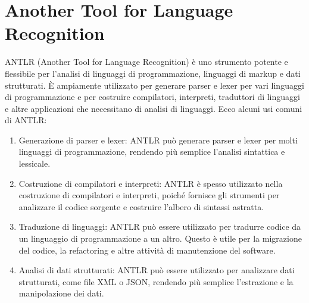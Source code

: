 \documentclass[../../main.tex]{subfiles}
\begin{document}
\section{Another Tool for Language Recognition}
ANTLR (Another Tool for Language Recognition) è uno strumento potente e flessibile per l'analisi di linguaggi di programmazione, linguaggi di markup e dati strutturati. È ampiamente utilizzato per generare parser e lexer per vari linguaggi di programmazione e per costruire compilatori, interpreti, traduttori di linguaggi e altre applicazioni che necessitano di analisi di linguaggi.
Ecco alcuni usi comuni di ANTLR:
\begin{enumerate}
    \item Generazione di parser e lexer: ANTLR può generare parser e lexer per molti linguaggi di programmazione, rendendo più semplice l'analisi sintattica e lessicale.
    \item Costruzione di compilatori e interpreti: ANTLR è spesso utilizzato nella costruzione di compilatori e interpreti, poiché fornisce gli strumenti per analizzare il codice sorgente e costruire l'albero di sintassi astratta.
    \item Traduzione di linguaggi: ANTLR può essere utilizzato per tradurre codice da un linguaggio di programmazione a un altro. Questo è utile per la migrazione del codice, la refactoring e altre attività di manutenzione del software.
    \item Analisi di dati strutturati: ANTLR può essere utilizzato per analizzare dati strutturati, come file XML o JSON, rendendo più semplice l'estrazione e la manipolazione dei dati.
\end{enumerate}
\end{document}
